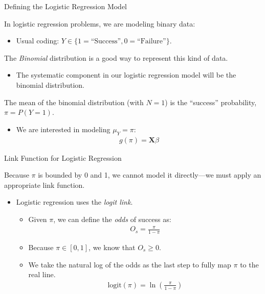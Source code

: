 \documentclass{beamer}\usepackage[]{graphicx}\usepackage[]{color}
\begin{document}
\watermarkon %

\begin{frame}{Defining the Logistic Regression Model}
  
  In logistic regression problems, we are modeling binary data:
  \vb
  \begin{itemize}
  \item Usual coding: $Y \in \{1 = \text{``Success''}, 0 = \text{``Failure''} \}$.
  \end{itemize}
  \vb 
  The \emph{Binomial} distribution is a good way to represent this kind of data.
  \vb
  \begin{itemize}
  \item The systematic component in our logistic regression model will be the 
    binomial distribution.
  \end{itemize}
  \vb
  The mean of the binomial distribution (with $N = 1$) is the ``success'' 
  probability, $\pi = P(Y = 1)$.
  \vb
  \begin{itemize}
  \item We are interested in modeling $\mu_Y = \pi$:
    \begin{align*}
      g(\pi) = \mathbf{X} \beta
    \end{align*}
  \end{itemize}
  
\end{frame}


\begin{frame}{Link Function for Logistic Regression}
  
  Because $\pi$ is bounded by 0 and 1, we cannot model it directly---we must 
  apply an appropriate link function.
  \vb
  \begin{itemize}
  \item Logistic regression uses the \emph{logit link}.
    \vb
    \begin{itemize}
    \item Given $\pi$, we can define the \emph{odds} of success as:
      \begin{align*}
        O_s = \frac{\pi}{1 - \pi}
      \end{align*}
    \item Because $\pi \in [0, 1]$, we know that $O_s \geq 0$.
      \vb
    \item We take the natural log of the odds as the last step to fully map 
      $\pi$ to the real line.
      \begin{align*}
        \text{logit}(\pi) = \ln \left(\frac{\pi}{1 - \pi}\right)
      \end{align*}
    \end{itemize}
  \end{itemize}
  
\end{frame}
\end{document}
